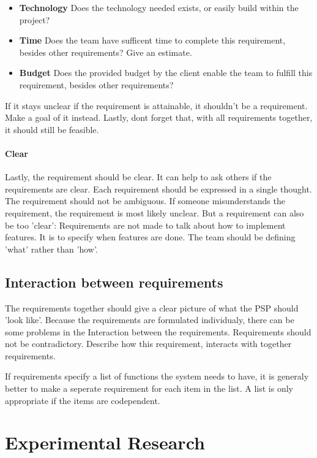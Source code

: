 \documentclass[10pt]{report}
\begin{document}
\begin{itemize}
	\item \textbf{Technology} Does the technology needed exists, or easily build within the project?
	\item \textbf{Time} Does the team have sufficent time to complete this requirement, besides other requirements? Give an estimate.
	\item \textbf{Budget} Does the provided budget by the client enable the team to fulfill this requirement, besides other requirements?
\end{itemize}

If it stays unclear if the requirement is attainable, it shouldn't be a requirement. Make a goal of it instead. Lastly, dont forget that, with all requirements together, it should still be feasible.

\paragraph{Clear}

Lastly, the requirement should be clear. It can help to ask others if the requirements are clear. Each requirement should be expressed in a single thought. The requirement should not be ambiguous. If someone misunderstands the requirement, the requirement is most likely unclear. But a requirement can also be too 'clear': Requirements are not made to talk about how to implement features. It is to specify when features are done. The team should be defining 'what' rather than 'how'.

\subsection{Interaction between requirements}

The requirements together should give a clear picture of what the PSP should 'look like'. Because the requirements are formulated individualy, there can be some problems in the Interaction between the requirements. Requirements should not be contradictory. Describe how this requirement, interacts with together requirements. 

If requirements specify a list of functions the system needs to have, it is generaly better to make a seperate requirement for each item in the list. A list is only appropriate if the items are codependent.

\newpage

\section{Experimental Research}
\end{document}
